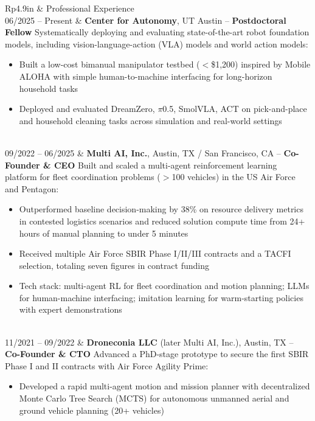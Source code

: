 \documentclass[letterpaper, 11pt]{article}
\newcommand{\headingfont}{\Large\color{CustomBlue}}
\newenvironment{SectionTable}[1]{
	\renewcommand*{\arraystretch}{1.3} %
	\setlength{\tabcolsep}{10pt}
	\begin{longtable}{Rp{4.9in}} & #1 \\}
{\end{longtable}}
\begin{document}
\begin{SectionTable}{\headingfont Professional Experience}

06/2025 -- Present &
\textbf{Center for Autonomy}, UT Austin -- \textbf{Postdoctoral Fellow} \newline
Systematically deploying and evaluating state-of-the-art robot foundation models, including vision-language-action (VLA) models and world action models:
\begin{itemize}[noitemsep, topsep=2pt]
\item Built a low-cost bimanual manipulator testbed ($<$\$1,200) inspired by Mobile ALOHA with simple human-to-machine interfacing for long-horizon household tasks
\item Deployed and evaluated DreamZero, \(\pi\)0.5, SmolVLA, ACT on pick-and-place and household cleaning tasks across simulation and real-world settings
\end{itemize} \\

09/2022 -- 06/2025 &
\textbf{Multi AI, Inc.}, Austin, TX / San Francisco, CA -- \textbf{Co-Founder \& CEO} \newline
Built and scaled a multi-agent reinforcement learning platform for fleet coordination problems ($>$100 vehicles) in the US Air Force and Pentagon:
\begin{itemize}[noitemsep, topsep=2pt]
\item Outperformed baseline decision-making by 38\% on resource delivery metrics in contested logistics scenarios and reduced solution compute time from 24+ hours of manual planning to under 5 minutes
\item Received multiple Air Force SBIR Phase I/II/III contracts and a TACFI selection, totaling seven figures in contract funding
\item Tech stack: multi-agent RL for fleet coordination and motion planning; LLMs for human-machine interfacing; imitation learning for warm-starting policies with expert demonstrations
\end{itemize} \\

11/2021 -- 09/2022 &
\textbf{Droneconia LLC} (later Multi AI, Inc.), Austin, TX -- \textbf{Co-Founder \& CTO} \newline
Advanced a PhD-stage prototype to secure the first SBIR Phase I and II contracts with Air Force Agility Prime:
\begin{itemize}[noitemsep, topsep=2pt]
\item Developed a rapid multi-agent motion and mission planner with decentralized Monte Carlo Tree Search (MCTS) for autonomous unmanned aerial and ground vehicle planning (20+ vehicles)
\end{itemize} \\


\end{SectionTable}
\end{document}
